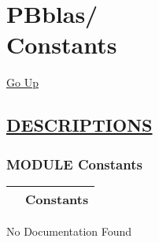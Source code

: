\chapter*{\color{headfile}
{\large PBblas\slash\hspace{0pt}}
 \\
Constants
}
\hypertarget{ecldoc:toc:PBblas.Constants}{}
\hyperlink{ecldoc:toc:root/PBblas}{Go Up}


\section*{\underline{\textsf{DESCRIPTIONS}}}
\subsection*{\textsf{\colorbox{headtoc}{\color{white} MODULE}
Constants}}

\hypertarget{ecldoc:PBblas.Constants}{}

{\renewcommand{\arraystretch}{1.5}
\begin{tabularx}{\textwidth}{|>{\raggedright\arraybackslash}l|X|}
\hline
\hspace{0pt}\mytexttt{\color{red} } & \textbf{Constants} \\
\hline
\end{tabularx}
}

\par





No Documentation Found







